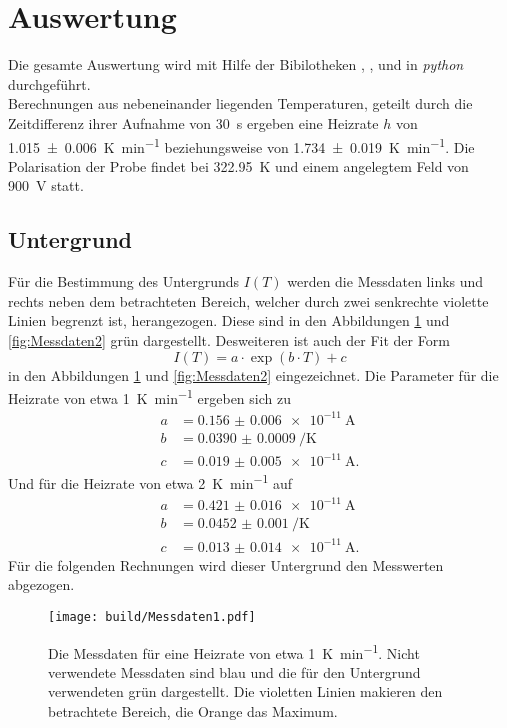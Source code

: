 \newpage
\section{Auswertung}
\label{sec:Auswertung}
Die gesamte Auswertung wird mit Hilfe der Bibilotheken \cite{matplotlib}, \cite{numpy}, \cite{scipy} und
\cite{uncertainties} in \textit{python} durchgeführt. \\
Berechnungen aus nebeneinander liegenden Temperaturen, geteilt durch die Zeitdifferenz ihrer Aufnahme von \SI{30}{\second}
ergeben eine Heizrate $h$ von \SI{1.015(6)}{\kelvin\per\minute} beziehungsweise von \SI{1.734(19)}{\kelvin\per\minute}.
Die Polarisation der Probe findet bei \SI{322.95}{\kelvin} und einem angelegtem Feld von \SI{900}{\volt} statt.

\subsection{Untergrund}
\label{sec:Unter}
Für die Bestimmung des Untergrunds $I(T)$ werden die Messdaten links und rechts neben dem betrachteten Bereich,
welcher durch zwei senkrechte violette Linien begrenzt ist, 
herangezogen. Diese sind in den Abbildungen \ref{fig:Messdaten1} und \ref{fig:Messdaten2} grün dargestellt.
Desweiteren ist auch der Fit der Form
\begin{equation}
    \label{eqn:exp}
    I(T) = a \cdot \exp \left(b\cdot T \right) + c
\end{equation}
in den Abbildungen \ref{fig:Messdaten1} und \ref{fig:Messdaten2} eingezeichnet.
Die Parameter für die Heizrate von etwa \SI{1}{\kelvin\per\minute} ergeben sich zu
\begin{align*}
    a &= \SI{0.156(6)e-11}{\ampere} \\
    b &= \SI{0.0390(9)}{\per\kelvin} \\
    c &= \SI{0.019(5)e-11}{\ampere}.
\end{align*}
Und für die Heizrate von etwa \SI{2}{\kelvin\per\minute} auf
\begin{align*}
    a &= \SI{0.421(16)e-11}{\ampere} \\
    b &= \SI{0.0452(10)}{\per\kelvin} \\
    c &= \SI{0.013(14)e-11}{\ampere}.
\end{align*}
Für die folgenden Rechnungen wird dieser Untergrund den Messwerten abgezogen.
\begin{figure}[htb]
  \centering
  \texttt{[image: build/Messdaten1.pdf]}
  \caption{Die Messdaten für eine Heizrate von etwa \SI{1}{\kelvin\per\minute}. Nicht verwendete Messdaten sind blau und die für den Untergrund verwendeten grün dargestellt. Die violetten Linien makieren den betrachtete Bereich, die Orange das Maximum.}
  \label{fig:Messdaten1}
\end{figure}
